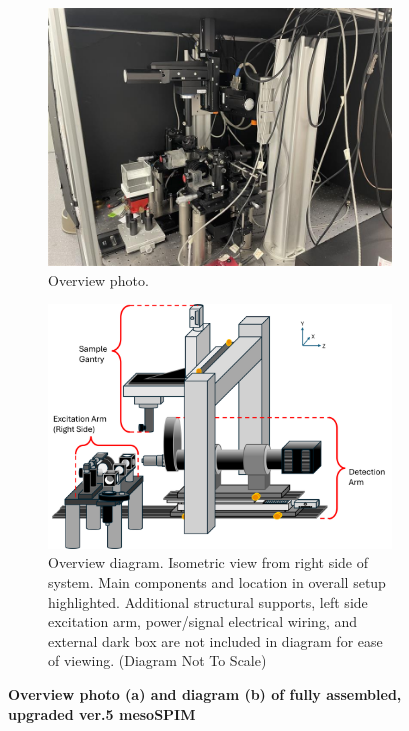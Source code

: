 \begin{figure}[H]
    \centering
    \begin{subfigure}[a]{0.75\textwidth}
    \centering
    \includegraphics[width=1\linewidth]{Images/OverviewPhoto.jpg}
    \caption{Overview photo.}
    \end{subfigure}
    \medskip
   
    \begin{subfigure}[b]{0.75\textwidth}
    \centering
    \includegraphics[width=1\linewidth]{Figures/Overview Diagram.png}
    \caption{Overview diagram. Isometric view from right side of system. Main components and location in overall setup highlighted. Additional structural supports, left side excitation arm, power/signal electrical wiring, and external dark box are not included in diagram for ease of viewing. (Diagram Not To Scale)}
    \end{subfigure}
   
   
    \caption{\textbf{Overview photo (a) and diagram (b) of fully assembled, upgraded ver.5 mesoSPIM}}
\end{figure}

